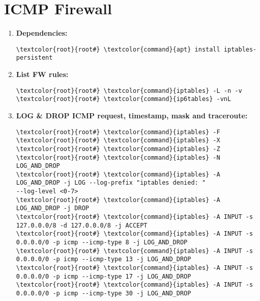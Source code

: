\documentclass[10pt, a4paper, onecolumn, openany]{book} %
\begin{document}
\section{ICMP Firewall}
\begin{enumerate}
    \item \textbf{Dependencies:}
\begin{Verbatim}[commandchars=\\\{\}]
\textcolor{root}{root#} \textcolor{command}{apt} install iptables-persistent
\end{Verbatim}
    \item \textbf{List FW rules:}
\begin{Verbatim}[commandchars=\\\{\}]
\textcolor{root}{root#} \textcolor{command}{iptables} -L -n -v
\textcolor{root}{root#} \textcolor{command}{ip6tables} -vnL
\end{Verbatim}
    \item \textbf{LOG \& DROP ICMP request, timestamp, mask and traceroute:}
\begin{Verbatim}[commandchars=\\\{\}]
\textcolor{root}{root#} \textcolor{command}{iptables} -F
\textcolor{root}{root#} \textcolor{command}{iptables} -X
\textcolor{root}{root#} \textcolor{command}{iptables} -Z
\textcolor{root}{root#} \textcolor{command}{iptables} -N LOG_AND_DROP
\textcolor{root}{root#} \textcolor{command}{iptables} -A LOG_AND_DROP -j LOG --log-prefix "iptables denied: "
--log-level <0-7>
\textcolor{root}{root#} \textcolor{command}{iptables} -A LOG_AND_DROP -j DROP 
\textcolor{root}{root#} \textcolor{command}{iptables} -A INPUT -s 127.0.0.0/8 -d 127.0.0.0/8 -j ACCEPT
\textcolor{root}{root#} \textcolor{command}{iptables} -A INPUT -s 0.0.0.0/0 -p icmp --icmp-type 8 -j LOG_AND_DROP
\textcolor{root}{root#} \textcolor{command}{iptables} -A INPUT -s 0.0.0.0/0 -p icmp --icmp-type 13 -j LOG_AND_DROP
\textcolor{root}{root#} \textcolor{command}{iptables} -A INPUT -s 0.0.0.0/0 -p icmp --icmp-type 17 -j LOG_AND_DROP
\textcolor{root}{root#} \textcolor{command}{iptables} -A INPUT -s 0.0.0.0/0 -p icmp --icmp-type 30 -j LOG_AND_DROP


\end{Verbatim}
\end{enumerate}
\end{document}
